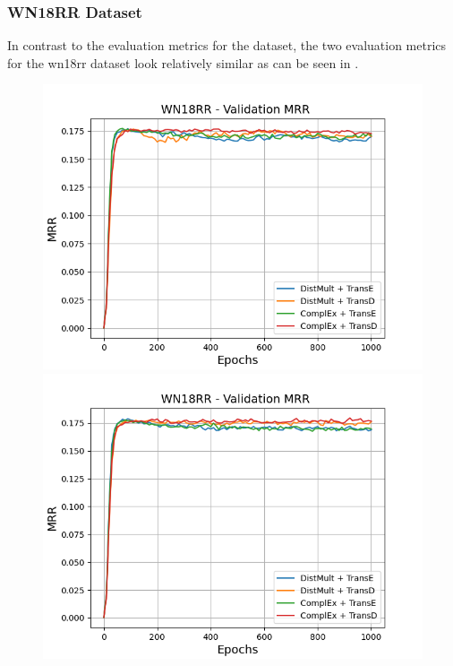 \subsubsection{WN18RR Dataset}
\label{subsubsec:methods_wn18rr}
In contrast to the evaluation metrics for the \umls dataset, the two evaluation metrics for the wn18rr dataset look relatively similar as can be seen in .
\begin{figure}
    \centering
    \begin{minipage}{.5\textwidth}
      \centering
      \includegraphics[width=0.9\linewidth]{figures/results/gan_train/not_pretrained/uncertainty/max/entropy/wn18rr/1k_epochs/uncertainty_wn18rr_mrrs.png}
    \end{minipage}%
    \begin{minipage}{.5\textwidth}
      \centering
      \includegraphics[width=0.9\linewidth]{figures/results/gan_train/not_pretrained/uncertainty/max_distribution/entropy/wn18rr/1k_epochs/uncertainty_wn18rr_mrrs.png}

\end{minipage}
\end{figure}
